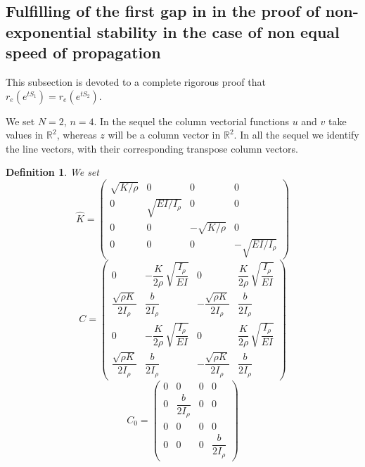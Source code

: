 \documentclass[10pt, english]{article}
\newtheorem{dfn}[thm]{Definition}
\begin{document}
{\subsection{Fulfilling of the first gap in \cite{SW2003} in the proof of non-exponential stability in the case of non equal speed of propagation}

This subsection is devoted to a complete rigorous proof that $r_e(e^{tS_1})=r_e(e^{tS_2})$.

We set $N=2$, $n=4$. In the sequel the column vectorial functions  $u$ and $v$ take values in $\mathbb{R}^2$, whereas $z$ will be a column vector in $\mathbb{R}^2$.
In all the sequel we identify the line vectors, with their corresponding transpose column vectors.

\begin{dfn}
We set
\begin{equation}\label{C4.1}%
\widehat{K}=%
\begin{pmatrix}
\sqrt{K/\rho} & 0  & 0 & 0 \\ 
0 & \sqrt{E I / I_{\rho}} & 0  & 0 \\
0  & 0 & -\sqrt{K/\rho} & 0 \\
0  & 0 & 0 & -\sqrt{E I / I_{\rho}} 
\end{pmatrix}%
\end{equation}
  \begin{equation}\label{C4.2}%
C=%
\begin{pmatrix}
0 & -\dfrac{K}{2\rho} \, \sqrt{\dfrac{I_{\rho}}{EI} }& 0  & \dfrac{K}{2\rho} \, \sqrt{\dfrac{I_{\rho}}{EI} }\\ 
\dfrac{\sqrt{\rho K}}{2I_{\rho}} & \dfrac{b}{2 I_{\rho}} & - \dfrac{\sqrt{\rho K}}{2I_{\rho}} & \dfrac{b}{2 I_{\rho}} \\
0 &  -\dfrac{K}{2\rho} \, \sqrt{\dfrac{I_{\rho}}{EI} } & 0 & \dfrac{K}{2\rho} \, \sqrt{\dfrac{I_{\rho}}{EI} } \\
 \dfrac{\sqrt{\rho K}}{2I_{\rho}} &  \dfrac{b}{2 I_{\rho}} & - \dfrac{\sqrt{\rho K}}{2I_{\rho}} & \dfrac{b}{2 I_{\rho}}
\end{pmatrix}%
\end{equation}
  \begin{equation}\label{C0}%
C_0=%
\begin{pmatrix}
0 & 0 & 0  & 0\\ 
0& \dfrac{b}{2 I_{\rho}} & 0 & 0\\
0 &  0 & 0 & 0 \\
0 &  0 & 0 & \dfrac{b}{2 I_{\rho}}
\end{pmatrix}%

\end{equation}
\end{dfn}}
\end{document}
